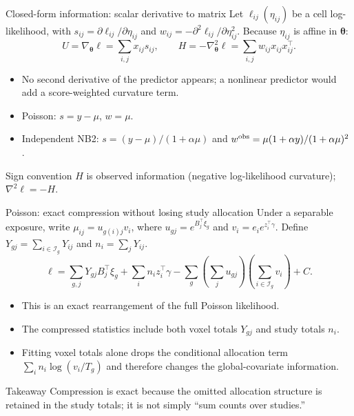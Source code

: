 \documentclass[aspectratio=169,10pt]{beamer}
\newcommand{\btheta}{\boldsymbol{\theta}}
\begin{document}
\begin{frame}{Closed-form information: scalar derivative to matrix}
Let $\ell_{ij}(\eta_{ij})$ be a cell log-likelihood, with
$s_{ij}=\partial\ell_{ij}/\partial\eta_{ij}$ and
$w_{ij}=-\partial^2\ell_{ij}/\partial\eta_{ij}^2$.
Because $\eta_{ij}$ is affine in $\btheta$:
\[
U=\nabla_{\btheta}\ell=\sum_{i,j}x_{ij}s_{ij},
\qquad
\boxed{H=-\nabla_{\btheta}^2\ell
=\sum_{i,j}w_{ij}x_{ij}x_{ij}^\top.}
\]
\begin{itemize}
  \item No second derivative of the predictor appears; a nonlinear predictor
        would add a score-weighted curvature term.
  \item Poisson: $s=y-\mu$, $w=\mu$.
  \item Independent NB2: $s=(y-\mu)/(1+\alpha\mu)$ and
        $w^{\rm obs}=\mu(1+\alpha y)/(1+\alpha\mu)^2$.
\end{itemize}
\begin{alertblock}{Sign convention}
$H$ is observed information (negative log-likelihood curvature);
$\nabla^2\ell=-H$.
\end{alertblock}
\end{frame}

\begin{frame}{Poisson: exact compression without losing study allocation}
Under a separable exposure, write
$\mu_{ij}=u_{g(i)j}v_i$, where
$u_{gj}=e^{B_j^\top\xi_g}$ and $v_i=e_i e^{z_i^\top\gamma}$.
Define $Y_{gj}=\sum_{i\in\mathcal I_g}Y_{ij}$ and $n_i=\sum_jY_{ij}$.
\[
\ell=\sum_{g,j}Y_{gj}B_j^\top\xi_g
       +\sum_i n_i z_i^\top\gamma
       -\sum_g\left(\sum_j u_{gj}\right)
                \left(\sum_{i\in\mathcal I_g}v_i\right)+C.
\]
\begin{itemize}
  \item This is an exact rearrangement of the full Poisson likelihood.
  \item The compressed statistics include both voxel totals $Y_{gj}$ and
        study totals $n_i$.
  \item Fitting voxel totals alone drops the conditional allocation term
        $\sum_i n_i\log(v_i/T_g)$ and therefore changes the global-covariate
        information.
\end{itemize}
\begin{block}{Takeaway}
Compression is exact because the omitted allocation structure is retained in
the study totals; it is not simply ``sum counts over studies.''
\end{block}
\end{frame}
\end{document}
